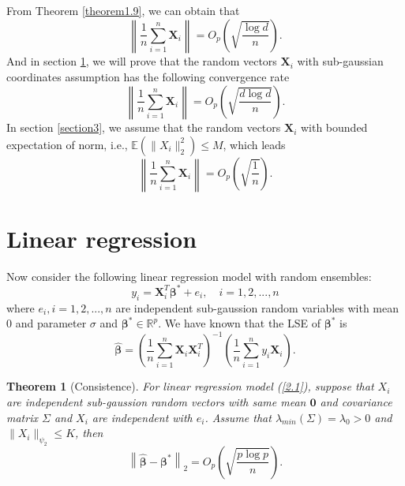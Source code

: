 \documentclass[12pt]{article}
\numberwithin{equation}{section}
\newtheorem{theorem}{Theorem}[section]
\begin{document}
From Theorem \ref{theorem1.9}, we can obtain that
$$
\left\|\frac{1}{n}\sum_{i=1}^{n} \mathbf{X}_{i}\right\|=O_p\left(\sqrt{\frac{\log d}{n}}\right).
$$
And in section \ref{section2}, we will prove that the random vectors $\boldsymbol{X}_i$ with sub-gaussian coordinates assumption has the following convergence rate
$$
\left\|\frac{1}{n}\sum_{i=1}^{n} \mathbf{X}_{i}\right\|=O_p\left(\sqrt{\frac{d\log d}{n}}\right).
$$
In section \ref{section3}, we assume that the random vectors $\boldsymbol{X}_i$ with bounded expectation of norm, i.e., $\mathbb{E}\left(\|X_i\|_2^2\right)\leq M$, which leads
$$
\left\|\frac{1}{n}\sum_{i=1}^{n} \mathbf{X}_{i}\right\|=O_p\left(\sqrt{\frac{1}{n}}\right).
$$
\section{Linear regression}\label{section2}
Now consider the following linear regression model with random ensembles:
\begin{equation}\label{2.1}
y_i=\boldsymbol{X}_i^T\boldsymbol{\beta}^{*}+e_i,\quad i=1,2,...,n
\end{equation}
where $e_i,i=1,2,...,n$ are independent sub-gaussion random variables with mean 0 and parameter $\sigma$ and $\boldsymbol{\beta}^{*}\in \mathbb{R}^p$. We have known that the LSE of $\boldsymbol{\beta}^{*}$ is 
\begin{equation}
\boldsymbol{\widehat{\beta}}=\left(\frac{1}{n}\sum_{i=1}^{n}\boldsymbol{X}_i\boldsymbol{X}_i^T\right)^{-1}\left(\frac{1}{n}\sum_{i=1}^ny_i\boldsymbol{X}_i\right).
\end{equation}
\begin{theorem}[Consistence]\label{theorem2.1}
	For linear regression model (\ref{2.1}), suppose that $X_i$ are independent sub-gaussion random vectors with same mean $\boldsymbol{0}$ and covariance matrix $\Sigma$ and $X_i$ are independent with $e_i$. Assume that $\lambda_{min}(\Sigma)=\lambda_0>0$ and $\|X_i\|_{\psi_{2}}\leq K$, then
	\begin{equation}
	\left\|\boldsymbol{\widehat{\beta}}-\boldsymbol{\beta}^{*}\right\|_2=O_p\left(\sqrt{\frac{p\log p}{n}}\right).
	\end{equation}
\end{theorem}
\end{document}
